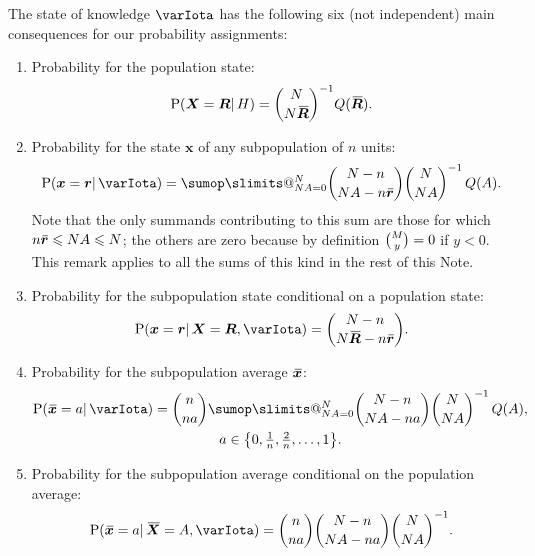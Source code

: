 \documentclass{article}
\makeatletter
\theoremstyle{remark}
\theoremstyle{innote}
\def\sum{\DOTSI\sumop\slimits@}
\renewcommand*{\|}{\mathpunct{|}}%
\renewcommand{\le}{\leqslant}%
\DeclarePairedDelimiter\set{\{}{\}}
\newcommand*{\p}{\mathrm{P}}%
\theoremstyle{simple}
\newcommand*{\widebar}[1]{{\mkern1.5mu\skew{2}\overline{\mkern-1.5mu#1\mkern-1.5mu}\mkern 1.5mu}}
\newcommand*{\av}{\widebar} %
\newcommand*{\sav}{\widebar} %
\newcommand*{\yxx}{x}%
\newcommand*{\yx}{\bm{\yxx}}%
\newcommand*{\yxs}{\sav{\yx}}%
\newcommand*{\yX}{\bm{X}}%
\newcommand*{\yXf}{\av{\yX}}%
\newcommand*{\yr}{\bm{r}}%
\newcommand*{\yrs}{\sav{\yr}}%
\newcommand*{\yR}{\bm{R}}%
\newcommand*{\yRf}{\av{\yR}}%
\newcommand*{\yH}{\varIota}
\makeatother
\begin{document}
The state of knowledge $\yH$ has the following six (not independent) main
consequences for our probability assignments:

\begin{enumerate}%
  \medskip\item\label{noitem:tot_plaus}Probability for the population state:
\begin{equation}
  \label{noeq:joint_plaus_N_homog}
  \p(\yX = \yR \| H) = \binom{N}{N\yRf}^{-1} Q(\yRf).
\end{equation}

\medskip
\item\label{noitem:marginal}Probability for the state $\yx$ of any subpopulation
  of $n$ units:
\begin{equation}
  \label{noeq:marginal}
    \p(\yx = \yr \| \yH) =
\sum_{N A =0}^{N} 
\binom{N-n}{N A-n\yrs}\binom{N}{N A}^{-1}\,
Q(A).
\end{equation}
Note that the only summands contributing to this sum are those for which
$n\yrs \le NA \le N$; the others are zero because by definition
$\tbinom{M}{y}=0$ if $y<0$. This remark applies to all the sums of this
kind in the rest of this Note.

\medskip
\item\label{noitem:conditional}Probability for the subpopulation
  state conditional on a population state:
\begin{equation}
  \label{noeq:conditional_total_state}
  \p(\yx = \yr \| \yX = \yR, \yH)
=
\binom{N-n}{N \yRf-n \yrs}.
\end{equation}

\medskip
\item\label{noitem:marginal_average}Probability for the
  subpopulation average $\yxs$:
\begin{multline}
  \label{noeq:subpop_average}
  \p(\yxs = a  \| \yH) = \binom{n}{n a}
 \sum_{N A=0}^{N}
\binom{N-n}{N A-n a}\binom{N}{N A}^{-1}\,
Q(A),
\\
a \in \set*{0,\tfrac{1}{n},\tfrac{2}{n},\dotsc,1}.
\end{multline}

\medskip
\item\label{noitem:conditional_average}Probability for the subpopulation
  average conditional on the population average:
\begin{equation}
  \label{noeq:conditional_prob}
  \p(\yxs = a \| \yXf = A, \yH)
=
\binom{n}{n a}\binom{N-n}{N A-n a}\binom{N}{N A}^{-1}.
\end{equation}


\end{enumerate}
\end{document}
